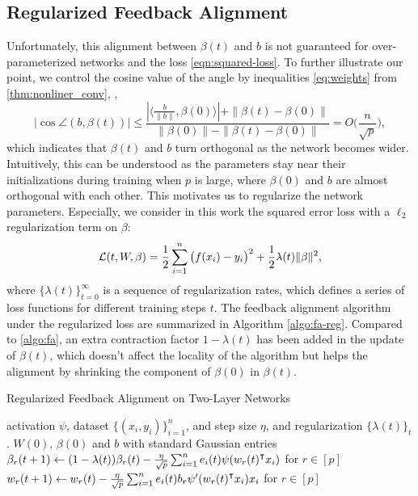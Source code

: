 \subsection{Regularized Feedback Alignment}
Unfortunately, this alignment between $\beta(t)$ and $b$ is not guaranteed for over-parameterized networks and the loss \eqref{eqn:squared-loss}. To further illustrate our point, we control the cosine value of the angle by inequalities \eqref{eq:weights} from \cref{thm:nonliner_conv}, \ie,
\begin{equation}
    \Big|\cos\angle(b, \beta(t))\Big| \leq \frac{|\langle \frac{b}{\|b\|}, \beta(0)\rangle|+ \|\beta(t)- \beta(0)\|}{\|\beta(0)\|-\|\beta(t)-\beta(0)\|} = O\big(\frac{n}{\sqrt p}\big),
\end{equation}
which indicates that $\beta(t)$ and $b$ turn orthogonal as the network becomes wider. Intuitively, this can be understood as the parameters stay near their initializations during training when $p$ is large, where $\beta(0)$ and $b$ are almost orthogonal with each other. This motivates us to regularize the network parameters. Especially, we consider in this work the squared error loss with a $\ell_2$ regularization term on $\beta$:
\begin{equation}
\label{eqn:loss-with-reg}
\mathcal{L}(t, W, \beta) = \frac{1}{2}\sum_{i=1}^n\big(f(x_i)-y_i\big)^2 + \frac{1}{2}\lambda(t)\|\beta\|^2,
\end{equation}
where $\{\lambda(t)\}_{t=0}^\infty$ is a sequence of regularization rates, which defines a series of loss functions for different training steps $t$. The feedback alignment algorithm under the regularized loss are summarized in Algorithm \ref{algo:fa-reg}. Compared to \cref{algo:fa}, an extra contraction factor $1-\lambda(t)$ has been added in the update of $\beta(t)$, which doesn't affect the locality of the algorithm but helps the alignment by shrinking the component of $\beta(0)$ in $\beta(t)$.

\begin{algorithm}[H]
\centering
\caption{Regularized Feedback Alignment on Two-Layer Networks}\label{algo:fa-reg}
    \begin{algorithmic}[1]
        \Require activation $\psi$, dataset $\{(x_i,y_i)\}_{i=1}^n$, and step size $\eta$, and regularization $\{\lambda(t)\}_t$.
         $W(0)$, $\beta(0)$ and $b$ with standard Gaussian entries
            \State $\beta_r(t+1) \gets (1-\lambda(t))\beta_r(t) - \frac{\eta}{\sqrt p} \sum_{i=1}^n e_i(t)\psi(w_r(t)\transpose x_i)$ for $r\in[p]$
            \State $w_r(t+1) \gets w_r(t) - \frac{\eta}{\sqrt{p}} \sum_{i=1}^n e_i(t) b_r\psi'(w_r(t)\transpose x_i)x_i$ for $r\in[p]$
        \EndWhile
    \end{algorithmic}    
\end{algorithm}

